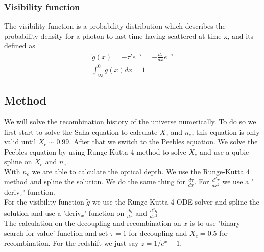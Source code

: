\documentclass{aa}
\begin{document}
\subsubsection{Visibility function}
The visibility function is a probability distribution which describes the probability density for a photon to last time having scattered at time x, and its defined as
\begin{align}
    \tilde g(x) = -\tau' e^{-\tau}=-\frac{d\tau}{dx}e^{-\tau}\\
    \int_\infty^0\tilde g(x)dx=1
\end{align}
\subsection{Method}
We will solve the recombination history of the universe numerically. To do so we first start to solve the Saha equation to calculate $X_e$ and $n_e$, this equation is only valid until $X_e\sim 0.99$. After that we switch to the Peebles equation. We solve the Peebles equation by using Runge-Kutta 4 method to solve $X_e$ and use a qubic spline on $X_e$ and $n_e$.\\
With $n_e$ we are able to calculate the optical depth. We use the Runge-Kutta 4 method and spline the solution. We do the same thing for $\frac{d\tau}{dx}$. For $\frac{d^2\tau}{dx^2}$ we use a '$\text{deriv}_x$'-function.\\
For the visibility function $\tilde g$ we use the Runge-Kutta 4 ODE solver and spline the solution and  use a '$\text{deriv}_x$'-function on $\frac{d\tilde g}{dx}$ and $\frac{d^2\tilde g}{dx^2}$\\
The calculation on the decoupling and recombination on $x$ is to use 'binary search for value'-function and set $\tau=1$ for decoupling and $X_e=0.5$ for recombination. For the redshift we just say $z=1/e^{x}-1$. 
\end{document}
